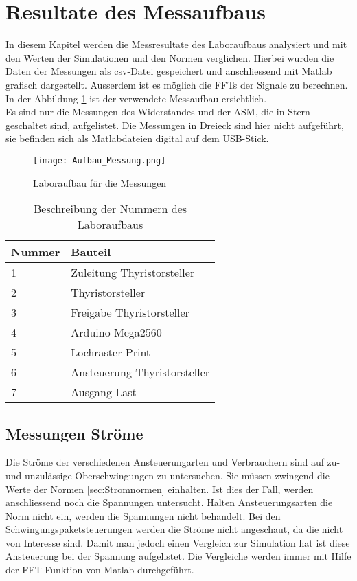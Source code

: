 \section{Resultate des Messaufbaus}
In diesem Kapitel werden die Messresultate des Laboraufbaus analysiert und mit den Werten der Simulationen und den Normen verglichen. Hierbei wurden die Daten der Messungen als csv-Datei gespeichert und anschliessend mit Matlab grafisch dargestellt. Ausserdem ist es möglich die FFTs der Signale zu berechnen. In der Abbildung \ref{fig:Aufbau Messung} ist der verwendete Messaufbau ersichtlich.\\
Es sind nur die Messungen des Widerstandes und der ASM, die in Stern geschaltet sind, aufgelistet. Die Messungen in Dreieck sind hier nicht aufgeführt, sie befinden sich als Matlabdateien digital auf dem USB-Stick. 

\begin{figure}[ht!]
	\centering
	\texttt{[image: Aufbau\_Messung.png]}	
	\caption{Laboraufbau für die Messungen}\label{fig:Aufbau Messung}
\end{figure}


\begin{table}[ht!]
	\centering
	\begin{tabular}{|l|l|}
		\hline
		Nummer & Bauteil                                       \\ \hline
		1      & Zuleitung Thyristorsteller                \\ \hline
		2      & Thyristorsteller                              \\ \hline
		3      & Freigabe Thyristorsteller                     \\ \hline
		4      & Arduino Mega2560                              \\ \hline
		5      & Lochraster Print							   \\ \hline
		6      & Ansteuerung Thyristorsteller                  \\ \hline
		7      & Ausgang Last                      \\ \hline
	\end{tabular}
	\caption{Beschreibung der Nummern des Laboraufbaus}\label{tab:Nummern_Laboraufbau}
\end{table}





\newpage
\subsection{Messungen Ströme}
Die Ströme der verschiedenen Ansteuerungarten und Verbrauchern sind auf zu- und unzulässige Oberschwingungen zu untersuchen. Sie müssen zwingend die Werte der Normen \ref{sec:Stromnormen} einhalten. Ist dies der Fall, werden anschliessend noch die Spannungen untersucht. Halten Ansteuerungsarten die Norm nicht ein, werden die Spannungen nicht behandelt. Bei den Schwingungspaketsteuerungen werden die Ströme nicht angeschaut, da die nicht von Interesse sind. Damit man jedoch einen Vergleich zur Simulation hat ist diese Ansteuerung bei der Spannung aufgelistet. Die Vergleiche werden immer mit Hilfe der FFT-Funktion von Matlab durchgeführt. 

